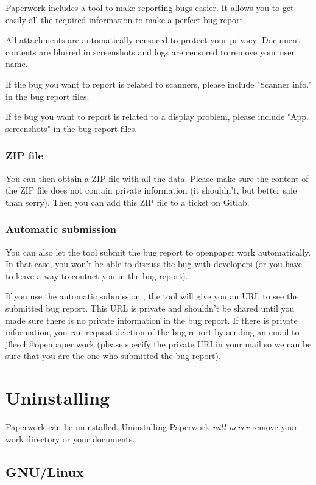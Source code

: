\documentclass[10pt,a4paper]{article}
\begin{document}
Paperwork includes a tool to make reporting bugs easier. It allows you to get
easily all the required information to make a perfect bug report.

All attachments are automatically censored to protect your privacy: Document
contents are blurred in screenshots and logs are censored to remove your user
name.

If the bug you want to report is related to scanners, please include
"Scanner info." in the bug report files.

If te bug you want to report is related to a display problem, please include
"App. screenshots" in the bug report files.


\subsubsection{ZIP file}

You can then obtain a ZIP file with all the data. Please make sure the content
of the ZIP file does not contain private information (it shouldn't, but better
safe than sorry). Then you can add this ZIP file to a ticket on Gitlab.


\subsubsection{Automatic submission}

You can also let the tool submit the bug report to openpaper.work
automatically. In that case, you won't be able to discuss the bug with
developers (or you have to leave a way to contact you in the bug report).

If you use the automatic submission , the tool will give you an URL to see the
submitted bug report. This URL is private and shouldn't be shared until you
made sure there is no private information in the bug report. If there is
private information, you can request deletion of the bug report by sending an
email to jflesch@openpaper.work (please specify the private URI in your mail
so we can be sure that you are the one who submitted the bug report).


\section{Uninstalling}

Paperwork can be uninstalled. Uninstalling Paperwork \emph{will never}
remove your work directory or your documents.

\subsection{GNU/Linux}
\end{document}
